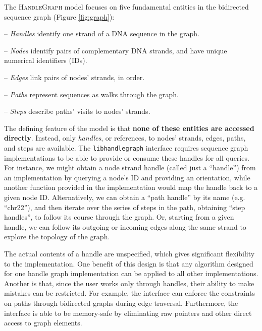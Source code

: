 \documentclass{article}
\begin{document}
The \textsc{HandleGraph} model focuses on five fundamental entities in the bidirected sequence graph (Figure \ref{fig:graph}):

-- \emph{Handles} identify one strand of a DNA sequence in the graph.

-- \emph{Nodes} identify pairs of complementary DNA strands, and have unique numerical identifiers (IDs).

-- \emph{Edges} link pairs of nodes' strands, in order.

-- \emph{Paths} represent sequences as walks through the graph.

-- \emph{Steps} describe paths' visits to nodes' strands.

The defining feature of the model is that \textbf{none of these entities are accessed directly}.
Instead, only \emph{handles}, or references, to nodes' strands, edges, paths, and steps are available.
The \texttt{libhandlegraph} interface requires sequence graph implementations to be able to provide or consume these handles for all queries.
For instance, we might obtain a node strand handle (called just a ``handle'') from an implementation by querying a node's ID and providing an orientation, while another function provided in the implementation would map the handle back to a given node ID.
Alternatively, we can obtain a ``path handle'' by its name (e.g. ``chr22''), and then iterate over the series of steps in the path, obtaining ``step handles'', to follow its course through the graph.
Or, starting from a given handle, we can follow its outgoing or incoming edges along the same strand to explore the topology of the graph.


The actual contents of a handle are unspecified, which gives significant flexibility to the implementation.
One benefit of this design is that any algorithm designed for one handle graph implementation can be applied to all other implementations.
Another is that, since the user works only through handles, their ability to make mistakes can be restricted.
For example, the interface can enforce the constraints on paths through bidirected graphs during edge traversal.
Furthermore, the interface is able to be memory-safe by eliminating raw pointers and other direct access to graph elements.
\end{document}
